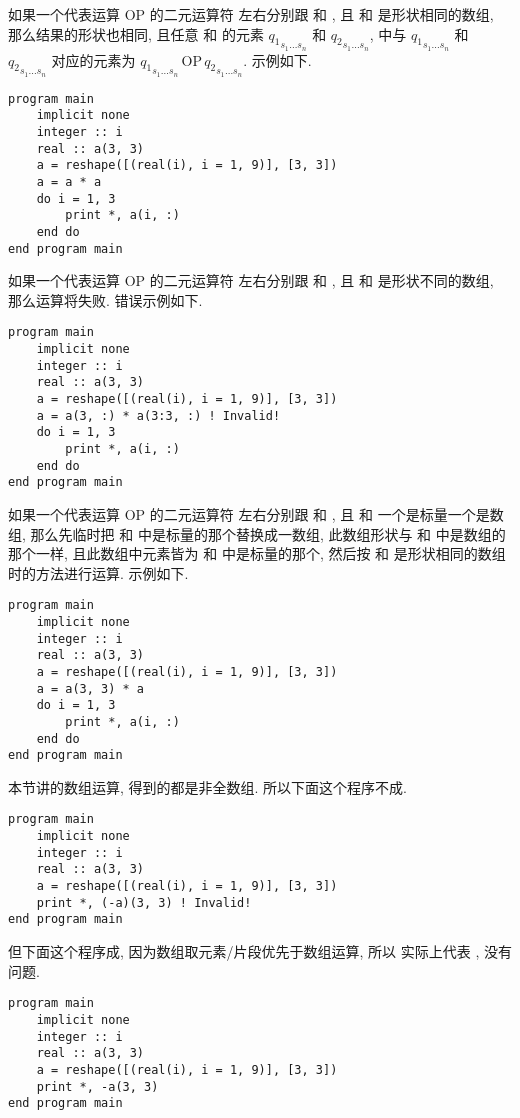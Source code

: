 如果一个代表运算 $\text{OP}$ 的二元运算符  左右分别跟  和 , 且  和  是形状相同的数组, 那么结果的形状也相同, 且任意  和  的元素 ${q_1}_{ s_1\dots s_n }$ 和 ${q_2}_{ s_1\dots s_n }$,  中与 ${q_1}_{ s_1\dots s_n }$ 和 ${q_2}_{ s_1\dots s_n }$ 对应的元素为 ${q_1}_{ s_1\dots s_n }\,\text{OP}\,{q_2}_{ s_1\dots s_n }$. 示例如下.
\begin{lstlisting}
program main
    implicit none
    integer :: i
    real :: a(3, 3)
    a = reshape([(real(i), i = 1, 9)], [3, 3])
    a = a * a
    do i = 1, 3
        print *, a(i, :)
    end do
end program main
\end{lstlisting}
如果一个代表运算 $\text{OP}$ 的二元运算符  左右分别跟  和 , 且  和  是形状不同的数组, 那么运算将失败. 错误示例如下.
\begin{lstlisting}
program main
    implicit none
    integer :: i
    real :: a(3, 3)
    a = reshape([(real(i), i = 1, 9)], [3, 3])
    a = a(3, :) * a(3:3, :) ! Invalid!
    do i = 1, 3
        print *, a(i, :)
    end do
end program main
\end{lstlisting}
如果一个代表运算 $\text{OP}$ 的二元运算符  左右分别跟  和 , 且  和  一个是标量一个是数组, 那么先临时把  和  中是标量的那个替换成一数组, 此数组形状与  和  中是数组的那个一样, 且此数组中元素皆为  和  中是标量的那个, 然后按  和  是形状相同的数组时的方法进行运算. 示例如下.
\begin{lstlisting}
program main
    implicit none
    integer :: i
    real :: a(3, 3)
    a = reshape([(real(i), i = 1, 9)], [3, 3])
    a = a(3, 3) * a
    do i = 1, 3
        print *, a(i, :)
    end do
end program main
\end{lstlisting}

本节讲的数组运算, 得到的都是非全数组. 所以下面这个程序不成.
\begin{lstlisting}
program main
    implicit none
    integer :: i
    real :: a(3, 3)
    a = reshape([(real(i), i = 1, 9)], [3, 3])
    print *, (-a)(3, 3) ! Invalid!
end program main
\end{lstlisting}
但下面这个程序成, 因为数组取元素/片段优先于数组运算, 所以  实际上代表 , 没有问题.
\begin{lstlisting}
program main
    implicit none
    integer :: i
    real :: a(3, 3)
    a = reshape([(real(i), i = 1, 9)], [3, 3])
    print *, -a(3, 3)
end program main
\end{lstlisting}
